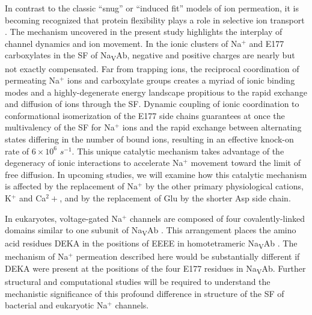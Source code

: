 \begin{refsection}
In contrast to the classic ``snug'' or ``induced fit'' models of ion permeation, it is becoming recognized that protein flexibility plays a role in selective ion transport \cite{Roux:2011ed,Andersen:2011ty}.  The mechanism uncovered in the present study highlights the interplay of channel dynamics and ion movement.  In the ionic clusters of Na$^+$ and E177 carboxylates in the SF of Na\textsubscript{V}Ab, negative and positive charges are nearly but not exactly compensated.  Far from trapping ions, the reciprocal coordination of permeating Na$^+$ ions and carboxylate groups creates a myriad of ionic binding modes and a highly-degenerate energy landscape propitious to the rapid exchange and diffusion of ions through the SF.  Dynamic coupling of ionic coordination to conformational isomerization of the E177 side chains guarantees at once the multivalency of the SF for Na$^+$ ions and the rapid exchange between alternating states differing in the number of bound ions, resulting in an effective knock-on rate of $6\times10^{6}$ $s^{-1}$.  This unique catalytic mechanism takes advantage of the degeneracy of ionic interactions to accelerate Na$^+$ movement toward the limit of free diffusion.  In upcoming studies, we will examine how this catalytic mechanism is affected by the replacement of Na$^+$ by the other primary physiological cations, K$^+$ and Ca$^2+$, and by the replacement of Glu by the shorter Asp side chain.

In eukaryotes, voltage-gated Na$^+$ channels are composed of four covalently-linked domains similar to one subunit of Na\textsubscript{V}Ab \cite{Hille:2001tw,Catterall:2000vb,Catterall:2012fh,Bezanilla:2008ht}. This arrangement places the amino acid residues DEKA in the positions of EEEE in homotetrameric Na\textsubscript{V}Ab \cite{Heinemann:1992ep}. The mechanism of Na$^+$ permeation described here would be substantially different if DEKA were present at the positions of the four E177 residues in Na\textsubscript{V}Ab.  Further structural and computational studies will be required to understand the mechanistic significance of this profound difference in structure of the SF of bacterial and eukaryotic Na$^+$ channels. 


\end{refsection}

